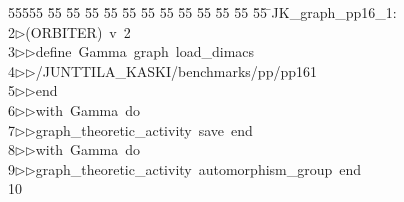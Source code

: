 %
%
\begin{tabbing}
55555 \= 55 \= 55 \= 55 \= 55 \= 55 \= 55 \= 55 \= 55 \= 55 \= 55 \= 55 \= 55 \= \>JK\_graph\_pp16\_1:\\[0pt]
2\>$\triangleright$\>(ORBITER)\ v\ 2\ \\[0pt]
3\>$\triangleright$\>$\triangleright$\>define\ Gamma\ graph\ load\_dimacs\ \\[0pt]
4\>$\triangleright$\>$\triangleright$\>/JUNTTILA\_KASKI/benchmarks/pp/pp161\ \\[0pt]
5\>$\triangleright$\>$\triangleright$\>end\ \\[0pt]
6\>$\triangleright$\>$\triangleright$\>with\ Gamma\ do\ \\[0pt]
7\>$\triangleright$\>$\triangleright$\>graph\_theoretic\_activity\ save\ end\ \\[0pt]
8\>$\triangleright$\>$\triangleright$\>with\ Gamma\ do\ \\[0pt]
9\>$\triangleright$\>$\triangleright$\>graph\_theoretic\_activity\ automorphism\_group\ end\ \\[0pt]
10\>\end{tabbing}
